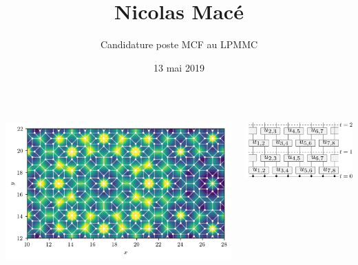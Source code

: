 \begin{frame}
\title{Nicolas Macé}
\author{Candidature poste MCF au LPMMC}
\date{13 mai 2019}
%
\titlepage
%
\btVFill
\begin{columns}
\begin{column}{0.4\textwidth}
\centering
\includegraphics[width=\columnwidth]{img/0_cover/SKK.png}
\end{column}
\begin{column}{0.4\textwidth}
\centering
\includegraphics[width=\columnwidth]{img/0_cover/circuit}
\end{column}
\end{columns}
\end{frame}
